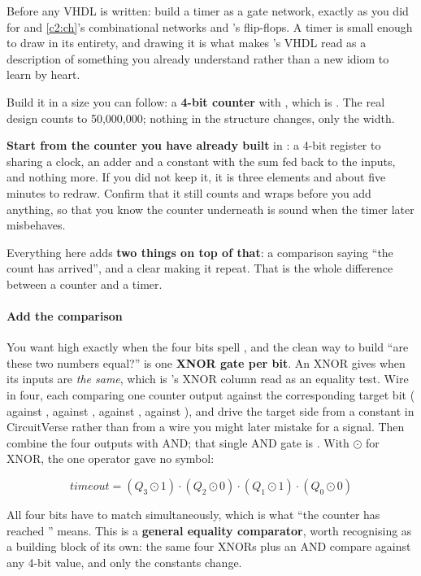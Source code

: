 Before any VHDL is written: build a timer as a gate network, exactly as you did for 
and \ref{c2:ch}'s combinational networks and 's flip-flops. A timer is small enough
to draw in its entirety, and drawing it is what makes 's VHDL read as a
description of something you already understand rather than a new idiom to learn by heart.

Build it in a size you can follow: a \textbf{4-bit counter} with , which is
. The real design counts to 50,000,000; nothing in the structure changes, only the width.

\textbf{Start from the counter you have already built} in : a 4-bit register
 to  sharing a clock, an adder and a constant  with the sum fed back to the
 inputs, and nothing more. If you did not keep it, it is three elements and about five
minutes to redraw. Confirm that it still counts and wraps before you add anything, so that you know
the counter underneath is sound when the timer later misbehaves.

Everything here adds \textbf{two things on top of that}: a comparison saying ``the count has
arrived'', and a clear making it repeat. That is the whole difference between a counter and a timer.

\paragraph{Add the comparison}
You want  high exactly when the four bits spell , and the clean way to
build ``are these two numbers equal?'' is one \textbf{XNOR gate per bit}. An XNOR gives 
when its inputs are \emph{the same}, which is 's XNOR column read as an equality
test. Wire in four, each comparing one counter output against the corresponding target bit
( against ,  against ,  against , 
against ), and drive the target side from a constant in CircuitVerse rather than from a wire
you might later mistake for a signal. Then combine the four outputs with AND; that single AND gate
is . With $\odot$ for XNOR, the one operator  gave no symbol:

\[ \mathit{timeout} = (Q_3 \odot 1) \cdot (Q_2 \odot 0) \cdot (Q_1 \odot 1) \cdot (Q_0 \odot 0) \]

All four bits have to match simultaneously, which is what ``the counter has reached ''
means. This is a \textbf{general equality comparator}, worth recognising as a building block of its
own: the same four XNORs plus an AND compare against any 4-bit value, and only the constants change.

